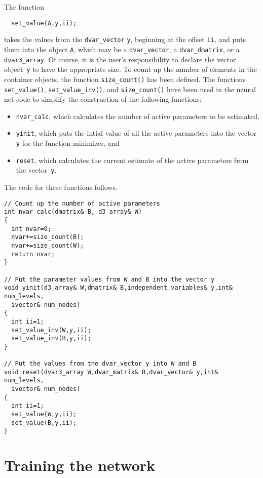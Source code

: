 \documentclass{admbmanual}
\begin{document}
The function
\begin{lstlisting}
  set_value(A,y,ii);
\end{lstlisting}
takes the values from the \texttt{dvar\_vector} \texttt{y}, beginning at the
offset \texttt{ii}, and puts them into the object \texttt{A}, which may be a
\texttt{dvar\_vector}, a \texttt{dvar\_dmatrix}, or a \texttt{dvar3\_array}. Of
course, it is the user's responsibility to declare the vector object~\texttt{y}
to have the appropriate size. To count up the number of elements in the
container objects, the function \texttt{size\_count()} has been defined. The
functions \texttt{set\_value()}, \texttt{set\_value\_inv()}, and
\texttt{size\_count()} have been used in the neural net code to simplify the
construction of the following functions:
\begin{itemize}
  \item \texttt{nvar\_calc}, which calculates the number of active parameters to
  be estimated,

  \item \texttt{yinit}, which puts the intial value of all the active parameters
  into the vector \texttt{y} for the function minimizer, and

  \item \texttt{reset}, which calculates the current estimate of the active
  parameters from the vector~\texttt{y}.
\end{itemize}
The code for these functions follows.
\begin{lstlisting}
// Count up the number of active parameters
int nvar_calc(dmatrix& B, d3_array& W)
{
  int nvar=0;
  nvar+=size_count(B);
  nvar+=size_count(W);
  return nvar;
}

// Put the parameter values from W and B into the vector y
void yinit(d3_array& W,dmatrix& B,independent_variables& y,int& num_levels,
  ivector& num_nodes)
{
  int ii=1;
  set_value_inv(W,y,ii);
  set_value_inv(B,y,ii);
}

// Put the values from the dvar_vector y into W and B
void reset(dvar3_array W,dvar_matrix& B,dvar_vector& y,int& num_levels,
  ivector& num_nodes)
{
  int ii=1;
  set_value(W,y,ii);
  set_value(B,y,ii);
}
\end{lstlisting}

\section{Training the network}
 
\end{document}

